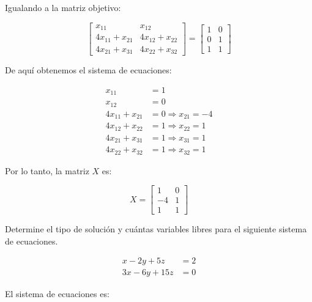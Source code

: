\documentclass[answers]{exam}
\begin{document}
\begin{questions}
\begin{solution}
        Igualando a la matriz objetivo:
        
        \[
        \begin{bmatrix}
         x_{11} & x_{12} \\
         4x_{11} + x_{21} & 4x_{12} + x_{22} \\
         4x_{21} + x_{31} & 4x_{22} + x_{32}
        \end{bmatrix} 
        =
        \begin{bmatrix}
         1 & 0 \\
         0 & 1 \\
         1 & 1
        \end{bmatrix}
        \]
        
        De aquí obtenemos el sistema de ecuaciones:
        
        \[
        \begin{aligned}
        x_{11} &= 1 \\
        x_{12} &= 0 \\
        4x_{11} + x_{21} &= 0 \Rightarrow x_{21} = -4 \\
        4x_{12} + x_{22} &= 1 \Rightarrow x_{22} = 1 \\
        4x_{21} + x_{31} &= 1 \Rightarrow x_{31} = 1 \\
        4x_{22} + x_{32} &= 1 \Rightarrow x_{32} = 1
        \end{aligned}
        \]
        
        Por lo tanto, la matriz \( X \) es:
        
        \[
        X = 
        \begin{bmatrix}
         1 & 0 \\
         -4 & 1 \\
         1 & 1
        \end{bmatrix}
        \]
        \end{solution}
        
        
    
    \question Determine el tipo de solución y cuántas variables libres para el siguiente sistema de ecuaciones.

    \[
    \begin{aligned}
    x - 2y + 5z &= 2 \\
    3x - 6y + 15z &= 0
    \end{aligned}
    \]

    \begin{solution}
        El sistema de ecuaciones es:
        

\end{solution}
\end{questions}
\end{document}
